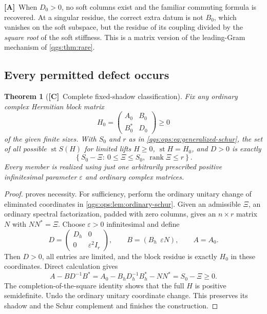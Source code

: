 \documentclass[11pt,oneside]{article}
\numberwithin{equation}{section}
\theoremstyle{plain}
\newtheorem{theorem}{Theorem}[section]
\theoremstyle{definition}
\theoremstyle{remark}
\DeclareMathOperator{\st}{st}
\DeclareMathOperator{\rank}{rank}
\newcommand{\TC}{\textcolor{TierC}{\textsf{\bfseries[C]}}}
\newcommand{\TA}{\textcolor{TierA}{\textsf{\bfseries[A]}}}
\begin{document}
\TA\ When $D_0>0$, no soft columns exist and the familiar commuting formula is recovered. At a singular residue, the correct extra datum is not $B_0$, which vanishes on the soft subspace, but the residue of its coupling divided by the \emph{square root} of the soft stiffness. This is a matrix version of the leading-Gram mechanism of \cref{qgs:thm:rare}.

\subsection{Every permitted defect occurs}
\begin{theorem}[\TC\ Complete fixed-shadow classification]\label{qgs:ops:thm:classification}
Fix any ordinary complex Hermitian block matrix
\[
 H_0=\begin{pmatrix}A_0&B_0\\B_0^*&D_0\end{pmatrix}\ge0
\]
of the given finite sizes. With $S_0$ and $r$ as in \eqref{qgs:ops:eq:generalized-schur}, the set of all possible $\st S(H)$ for limited lifts $H\ge0$, $\st H=H_0$, and $D>0$ is exactly
\begin{equation}\label{qgs:ops:eq:classification-set}
 \boxed{\left\{S_0-\Xi:\ 0\le\Xi\le S_0,
                           \ \rank\Xi\le r\right\}.}
\end{equation}
Every member is realized using just one arbitrarily prescribed positive infinitesimal parameter $\varepsilon$ and ordinary complex matrices.
\end{theorem}
\begin{proof}
 proves necessity. For sufficiency, perform the ordinary unitary change of eliminated coordinates in \cref{qgs:ops:lem:ordinary-schur}. Given an admissible $\Xi$, an ordinary spectral factorization, padded with zero columns, gives an $n\times r$ matrix $N$ with $NN^*=\Xi$. Choose $\varepsilon>0$ infinitesimal and define
\begin{equation}\label{qgs:ops:eq:realize}
 D=\begin{pmatrix}D_h&0\\0&\varepsilon^2 I_r\end{pmatrix},\qquad
 B=(B_h\ \ \varepsilon N),\qquad A=A_0.
\end{equation}
Then $D>0$, all entries are limited, and the block residue is exactly $H_0$ in these coordinates. Direct calculation gives
\[
 A-BD^{-1}B^*=A_0-B_hD_h^{-1}B_h^*-NN^*
 =S_0-\Xi\ge0.
\]
The completion-of-the-square identity shows that the full $H$ is positive semidefinite. Undo the ordinary unitary coordinate change. This preserves its shadow and the Schur complement and finishes the construction.
\end{proof}
\end{document}
